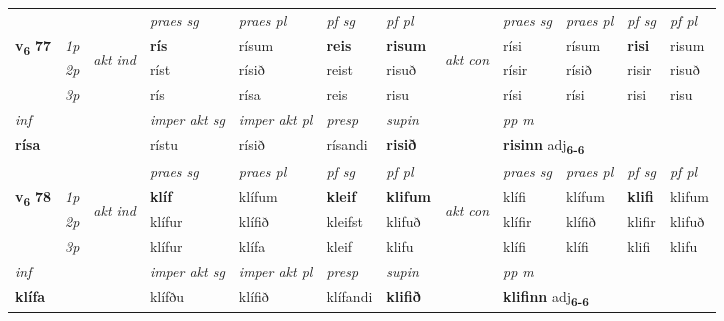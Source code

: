\begin{longtable}[l]{X>{\footnotesize\itshape}llXXXXlXXXX}
 & &   & \textit{praes sg}  & \textit{praes pl}    & \textit{ pf sg} & \textit{pf pl} & & \textit{praes sg}  & \textit{praes pl}    & \textit{pf sg} & \textit{pf pl }  \\ \cmidrule{4-7} \cmidrule{9-12}
 \multirow{2}{*}{{{\textbf{v{\textsubscript{6}}} \Large{\textbf{77}}}}}  & 1p & \multirow{3}{*}{\begin{turn}{90}\textit{akt ind}\end{turn}} & \textbf{rís} & rísum & \textbf{reis} & \textbf{risum} & \multirow{3}{*}{\begin{turn}{90}\textit{akt con}\end{turn}} &rísi & rísum & \textbf{risi} & risum\\*
 & 2p &  &  ríst  & rísið & reist & risuð & & rísir & rísið & risir & risuð \\*
 & 3p &  & rís & rísa & reis & risu & & rísi & rísi& risi & risu \\*
\cmidrule{4-7} \cmidrule{9-12}

   {\textit{inf}} & &  & \textit{imper akt sg} & \textit{imper akt pl}   & \textit{presp} & \textit{supin}  && \textit{pp m} \\*
  {\textbf{rísa}} & && rístu  & rísið   & rísandi &  \textbf{risið}  && \multicolumn{2}{l}{\textbf{risinn} adj\textbf{\textsubscript{6-6}}} \\*

\midrule

 & &   & \textit{praes sg}  & \textit{praes pl}    & \textit{ pf sg} & \textit{pf pl} & & \textit{praes sg}  & \textit{praes pl}    & \textit{pf sg} & \textit{pf pl }  \\ \cmidrule{4-7} \cmidrule{9-12}
 \multirow{2}{*}{{{\textbf{v{\textsubscript{6}}} \Large{\textbf{78}}}}}  & 1p & \multirow{3}{*}{\begin{turn}{90}\textit{akt ind}\end{turn}} & \textbf{klíf} & klífum & \textbf{kleif} & \textbf{klifum} & \multirow{3}{*}{\begin{turn}{90}\textit{akt con}\end{turn}} &klífi & klífum & \textbf{klifi} & klifum\\*
 & 2p &  &  klífur  & klífið & kleifst & klifuð & & klífir & klífið & klifir & klifuð \\*
 & 3p &  & klífur & klífa & kleif & klifu & & klífi & klífi& klifi & klifu \\*
\cmidrule{4-7} \cmidrule{9-12}

   {\textit{inf}} & &  & \textit{imper akt sg} & \textit{imper akt pl}   & \textit{presp} & \textit{supin}  && \textit{pp m} \\*
  {\textbf{klífa}} & && klífðu  & klífið   & klífandi &  \textbf{klifið}  && \multicolumn{2}{l}{\textbf{klifinn} adj\textbf{\textsubscript{6-6}}} \\*


\end{longtable}

